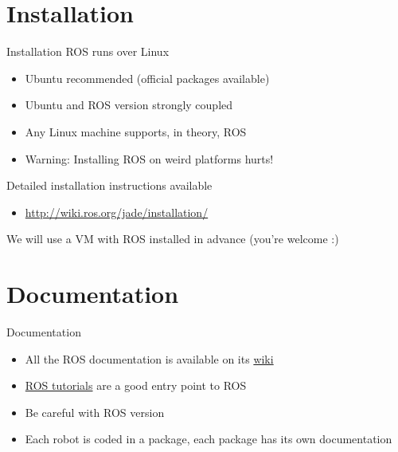 \documentclass[10pt,compress]{beamer} %
\begin{document}
\section{Installation}
\begin{frame}{Installation}
		ROS runs over Linux
			\begin{itemize}
				\item Ubuntu recommended (official packages available)
				\item Ubuntu and ROS version strongly coupled
				\item Any Linux machine supports, in theory, ROS
				\item Warning: Installing ROS on weird platforms hurts!
			\end{itemize}
		Detailed installation instructions available
			\begin{itemize}
				\item \url{http://wiki.ros.org/jade/installation/}
			\end{itemize}
		We will use a VM with ROS installed in advance (you're welcome :)
\end{frame}

\section{Documentation}
\begin{frame}{Documentation}
	\begin{itemize}
		\item All the ROS documentation is available on its \href{http://wiki.ros.org/}{wiki}
		\item \href{http://wiki.ros.org/ROS/Tutorials}{ROS tutorials} are a good entry point to ROS
		\item Be careful with ROS version
		\item Each robot is coded in a package, each package has its own documentation
	\end{itemize}
\end{frame}
\end{document}
